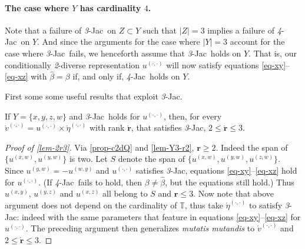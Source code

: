 \documentclass[12pt,a4paper,twoside]{article}
\newcommand{\mbbt}{{\mathds {T}}}
\newcommand{\xy}{{(x, y)}}
\newcommand{\yz}{{(y,z)}}
\newcommand{\xz}{{(x,z)}}
\newcommand{\xw}{{(x,w)}}
\newcommand{\yw}{{(y,w)}}
\newcommand{\wy}{{(w,y)}}
\newcommand{\zw}{(z,w)}
\newcommand{\dd}{{(\cdot,\cdot)}}
\newcommand{\fourjac}{\textup{\textit{4}-Jac}}
\newcommand{\threejac}{\textup{\textit{3}-Jac}}
\begin{document}
\begin{appendices}
\paragraph{The case where $Y$ has cardinality $4$.\hskip-4pt} Note that a
failure of \threejac\ on $Z \subset Y$ such that $\lvert Z \rvert = 3$ implies a
failure of \fourjac\ on $Y$. And since the arguments for the case where
$\lvert Y \rvert = 3$ account for the case where \threejac\ fails, we henceforth
assume that \threejac\ holds on $Y$. That is, our conditionally \emph{2}-diverse
representation $u^{\dd}$ will now satisfy equations \eqref{eq-xy}--\eqref{eq-xz}
with $\hat{\beta} = \beta$ if, and only if, \fourjac\ holds on $Y$.

First some some useful results that exploit \threejac.
\begin{proposition}\label{lem-2r3}
  If $Y = \{x, y, z, w\}$ and \threejac\ holds for $u^{\dd}$, then, for every
  $\acute{v}^{\dd} = u ^{\dd} \times \acute{\eta}^{\dd}$ with rank
  $\acute{\mathbf r}$, that satisfies \threejac,
  $2\leq \acute{\mathbf r}\leq 3$.
\end{proposition}
\begin{proof}[Proof of \cref{lem-2r3}]
  Via \cref{prop-c2dQ} and \cref{lem-Y3-r2}, $\mathbf r \geq 2$. Indeed the
  span of $\{ u^{\xw}, u^{\yw}\}$ is two. Let $S$ denote the span of
  $\{u^{\xw}, u^{\yw} ,u^{\zw}\}$.  Since $u^{\yw} = - u^{\wy}$ and $u ^{\dd}$
  satisfies \threejac, equations \eqref{eq-xy}--\eqref{eq-xz} hold for
  $u^{\dd}$.  (If \fourjac\ fails to hold, then $\beta \neq \hat \beta$, but the
  equations still hold.) Thus $u^{\xy}$, $u^{\yz}$ and $u^{\xz}$ all belong to
  $S$ and $\mathbf{r} \leq 3$. Now note that above argument does not depend on
  the cardinality of $\mbbt$, thus take $\acute{\eta}^{\dd}$ to
  satisfy \threejac: indeed with the same parameters that feature in
  equations \eqref{eq-xy}--\eqref{eq-xz} for $u^{\dd}$. The preceding
  argument then {generalizes} \emph{mutatis mutandis} to $\acute{v}^{\dd}$ and
  $2 \leq \acute{\mathbf r} \leq 3$.
\end{proof}


\end{appendices}
\end{document}
